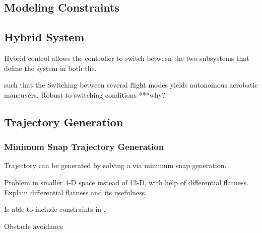 

\subsection{Modeling Constraints}




\subsection{Hybrid System}
Hybrid control allows the controller to switch between the two subsystems that define the system in both 
the.  

such that the 
Switching between several flight modes yields autonomous acrobatic maneuvers. Robust to switching conditions ***why?\\
\cite{Tang2014}

\subsection{Trajectory Generation}
\subsubsection{Minimum Snap Trajectory Generation}

Trajectory can be generated by solving a  via minimum snap generation.

Problem in smaller 4-D space instead of 12-D, with help of differential flatness. Explain differential flatness and its usefulness.

Is able to include constraints in .

\cite{Mellinger2011}

Obstacle avoidance

